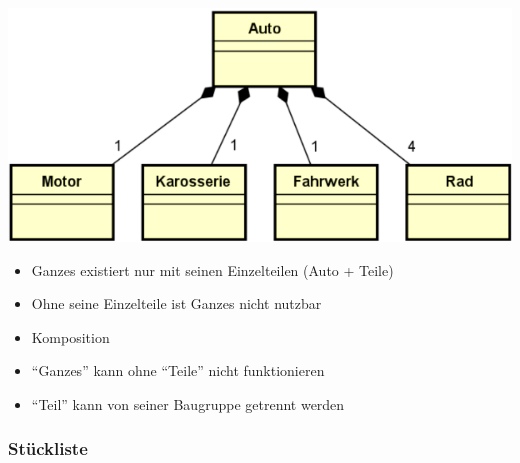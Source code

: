 \documentclass[11pt, a4paper]{article}
\begin{document}
\begin{minipage}[h]{0.25\textwidth}
    \centering \includegraphics[width=1\textwidth]{Analysemuster-02.png} 
\end{minipage}
\begin{minipage}[h]{0.7\textwidth}
    \raggedleft
    \begin{itemize}
        \item Ganzes existiert nur mit seinen Einzelteilen (Auto + Teile)
        \item Ohne seine Einzelteile ist Ganzes nicht nutzbar
    \end{itemize}
    \vspace{1em}
    \begin{itemize}
        \item Komposition
        \item “Ganzes” kann ohne “Teile” nicht funktionieren
        \item “Teil” kann von seiner Baugruppe getrennt werden
    \end{itemize}
\end{minipage}



\subsubsection*{Stückliste}
\end{document}
